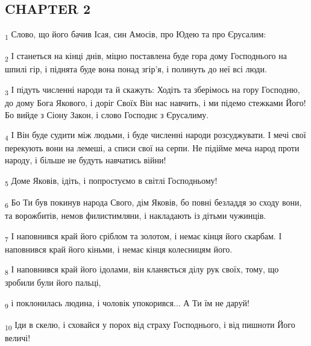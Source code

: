 \subsection{CHAPTER 2}
\begin{tcolorbox}
\textsubscript{1} Слово, що його бачив Ісая, син Амосів, про Юдею та про Єрусалим:
\end{tcolorbox}
\begin{tcolorbox}
\textsubscript{2} І станеться на кінці днів, міцно поставлена буде гора дому Господнього на шпилі гір, і піднята буде вона понад згір'я, і полинуть до неї всі люди.
\end{tcolorbox}
\begin{tcolorbox}
\textsubscript{3} І підуть численні народи та й скажуть: Ходіть та зберімось на гору Господню, до дому Бога Якового, і доріг Своїх Він нас навчить, і ми підемо стежками Його! Бо вийде з Сіону Закон, і слово Господнє з Єрусалиму.
\end{tcolorbox}
\begin{tcolorbox}
\textsubscript{4} І Він буде судити між людьми, і буде численні народи розсуджувати. І мечі свої перекують вони на лемеші, а списи свої на серпи. Не підійме меча народ проти народу, і більше не будуть навчатись війни!
\end{tcolorbox}
\begin{tcolorbox}
\textsubscript{5} Доме Яковів, ідіть, і попростуємо в світлі Господньому!
\end{tcolorbox}
\begin{tcolorbox}
\textsubscript{6} Бо Ти був покинув народа Свого, дім Яковів, бо повні безладдя зо сходу вони, та ворожбитів, немов филистимляни, і накладають із дітьми чужинців.
\end{tcolorbox}
\begin{tcolorbox}
\textsubscript{7} І наповнився край його сріблом та золотом, і немає кінця його скарбам. І наповнився край його кіньми, і немає кінця колесницям його.
\end{tcolorbox}
\begin{tcolorbox}
\textsubscript{8} І наповнився край його ідолами, він кланяється ділу рук своїх, тому, що зробили були його пальці,
\end{tcolorbox}
\begin{tcolorbox}
\textsubscript{9} і поклонилась людина, і чоловік упокорився... А Ти їм не даруй!
\end{tcolorbox}
\begin{tcolorbox}
\textsubscript{10} Іди в скелю, і сховайся у порох від страху Господнього, і від пишноти Його величі!
\end{tcolorbox}
